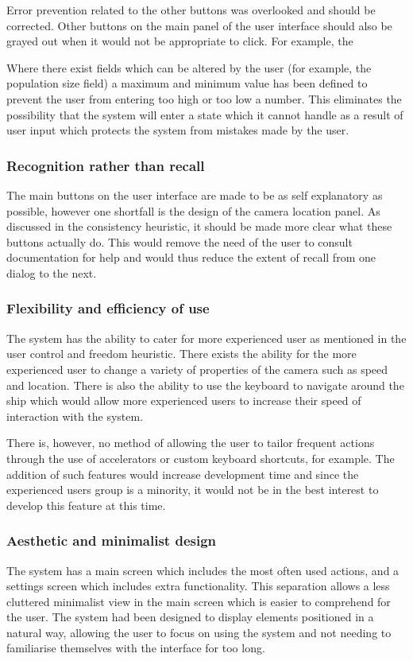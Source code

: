 Error prevention related to the other buttons was overlooked and should be corrected. Other buttons on the main panel of the user interface should also be grayed out when it would not be appropriate to click. For example, the

Where there exist fields which can be altered by the user (for example, the population size field) a maximum and minimum value has been defined to prevent the user from entering too high or too low a number. This eliminates the possibility that the system will enter a state which it cannot handle as a result of user input which protects the system from mistakes made by the user.

\subsubsection{Recognition rather than recall}
The main buttons on the user interface are made to be as self explanatory as possible, however one shortfall is the design of the camera location panel. As discussed in the consistency heuristic, it should be made more clear what these buttons actually do. This would remove the need of the user to consult documentation for help and would thus reduce the extent of recall from one dialog to the next.

\subsubsection{Flexibility and efficiency of use}
The system has the ability to cater for more experienced user as mentioned in the user control and freedom heuristic. There exists the ability for the more experienced user to change a variety of properties of the camera such as speed and location. There is also the ability to use the keyboard to navigate around the ship which would allow more experienced users to increase their speed of interaction with the system.

There is, however, no method of allowing the user to tailor frequent actions through the use of accelerators or custom keyboard shortcuts, for example. The addition of such features would increase development time and since the experienced users group is a minority, it would not be in the best interest to develop this feature at this time.

\subsubsection{Aesthetic and minimalist design}
The system has a main screen which includes the most often used actions, and a settings screen which includes extra functionality. This separation allows a less cluttered minimalist view in the main screen which is easier to comprehend for the user. The system had been designed to display elements positioned in a natural way, allowing the user to focus on using the system and not needing to familiarise themselves with the interface for too long.   

